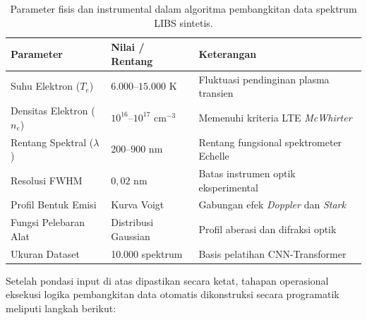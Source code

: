 \documentclass[12pt, a4paper]{article}
\begin{document}
\begin{table}[H]
\centering
\caption{Parameter fisis dan instrumental dalam algoritma pembangkitan data spektrum LIBS sintetis.}
\label{tab:parameter-simulasi}
\small
\begin{tabular}{|l|l|p{4.8cm}|}
\hline
Parameter & Nilai / Rentang & Keterangan \\
\hline
Suhu Elektron ($T_e$) & $6.000$--$15.000$ K & Fluktuasi pendinginan plasma transien \citep{cristoforetti2010} \\
\hline
Densitas Elektron ($n_e$) & $10^{16}$--$10^{17}$ cm$^{-3}$ & Memenuhi kriteria LTE \textit{McWhirter} \\
\hline
Rentang Spektral ($\lambda$) & 200--900 nm & Rentang fungsional spektrometer Echelle \\
\hline
Resolusi FWHM & $0{,}02$ nm & Batas instrumen optik eksperimental \\
\hline
Profil Bentuk Emisi & Kurva Voigt & Gabungan efek \textit{Doppler} dan \textit{Stark} \\
\hline
Fungsi Pelebaran Alat & Distribusi Gaussian & Profil aberasi dan difraksi optik \\
\hline
Ukuran Dataset & 10.000 spektrum & Basis pelatihan CNN-Transformer \\
\hline
\end{tabular}
\end{table}

Setelah pondasi input di atas dipastikan secara ketat, tahapan operasional eksekusi logika pembangkitan data otomatis dikonstruksi secara programatik meliputi langkah berikut:
\end{document}
